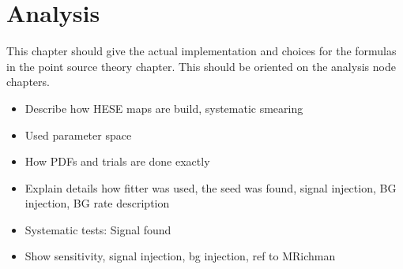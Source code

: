\chapter{Analysis}

This chapter should give the actual implementation and choices for the formulas in the point source theory chapter.
This should be oriented on the analysis node chapters.

\begin{itemize}
  \item Describe how HESE maps are build, systematic smearing
  \item Used parameter space
  \item How PDFs and trials are done exactly
  \item Explain details how fitter was used, the seed was found, signal injection, BG injection, BG rate description
  \item Systematic tests: Signal found
  \item Show sensitivity, signal injection, bg injection, ref to MRichman
\end{itemize}
